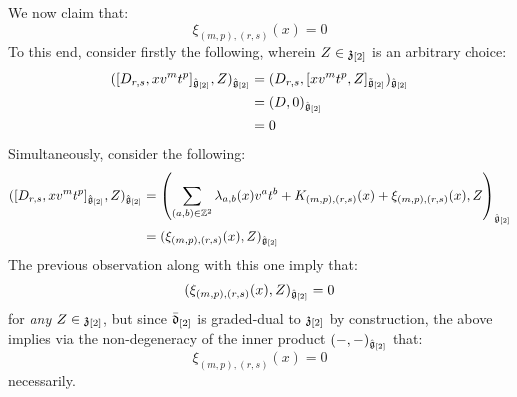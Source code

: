 \begin{remark}
\begin{enumerate}
                    We now claim that:
                        $$\xi_{(m, p), (r, s)}(x) = 0$$
                    To this end, consider firstly the following, wherein $Z \in \mathfrak{z}_{[2]}$ is an arbitrary choice:
                        $$
                            \begin{aligned}
                                ( [D_{r, s}, x v^m t^p]_{\hat{\mathfrak{g}}_{[2]}}, Z )_{\hat{\mathfrak{g}}_{[2]}} & = ( D_{r, s}, [x v^m t^p, Z]_{\tilde{\mathfrak{g}}_{[2]}} )_{\hat{\mathfrak{g}}_{[2]}}
                                \\
                                & = (D, 0)_{\hat{\mathfrak{g}}_{[2]}}
                                \\
                                & = 0
                            \end{aligned}
                        $$
                    Simultaneously, consider the following:
                        $$
                            \begin{aligned}
                                ( [D_{r, s}, x v^m t^p]_{\hat{\mathfrak{g}}_{[2]}}, Z )_{\hat{\mathfrak{g}}_{[2]}} & = \left( \sum_{(a, b) \in \mathbb{Z}^2} \lambda_{a, b}(x) v^a t^b + K_{(m, p), (r, s)}(x) + \xi_{(m, p), (r, s)}(x), Z \right)_{\hat{\mathfrak{g}}_{[2]}}
                                \\
                                & = ( \xi_{(m, p), (r, s)}(x), Z )_{\hat{\mathfrak{g}}_{[2]}}
                            \end{aligned}
                        $$
                    The previous observation along with this one imply that:
                        $$( \xi_{(m, p), (r, s)}(x), Z )_{\hat{\mathfrak{g}}_{[2]}} = 0$$
                    for \textit{any} $Z \in \mathfrak{z}_{[2]}$, but since $\bar{\mathfrak{d}}_{[2]}$ is graded-dual to $\mathfrak{z}_{[2]}$ by construction, the above implies via the non-degeneracy of the inner product $(-, -)_{\hat{\mathfrak{g}}_{[2]}}$ that:
                        $$\xi_{(m, p), (r, s)}(x) = 0$$
                    necessarily. 


\end{enumerate}
\end{remark}
